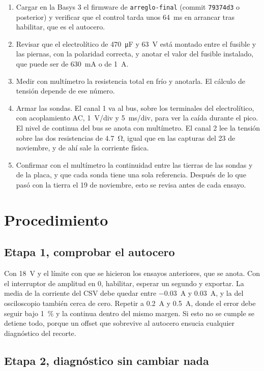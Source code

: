 \documentclass[11pt,a4paper]{article}
\begin{document}
\begin{enumerate}
\item Cargar en la Basys 3 el firmware de \texttt{arreglo-final} (commit \texttt{79374d3} o posterior) y verificar que el control tarda unos \SI{64}{ms} en arrancar tras habilitar, que es el autocero.
\item Revisar que el electrolítico de \SI{470}{\micro F} y \SI{63}{V} está montado entre el fusible y las piernas, con la polaridad correcta, y anotar el valor del fusible instalado, que puede ser de \SI{630}{mA} o de \SI{1}{A}.
\item Medir con multímetro la resistencia total en frío y anotarla. El cálculo de tensión depende de ese número.
\item Armar las sondas. El canal 1 va al bus, sobre los terminales del electrolítico, con acoplamiento AC, \SI{1}{V/div} y \SI{5}{ms/div}, para ver la caída durante el pico. El nivel de continua del bus se anota con multímetro. El canal 2 lee la tensión sobre las dos resistencias de \SI{4.7}{\ohm}, igual que en las capturas del 23 de noviembre, y de ahí sale la corriente física.
\item Confirmar con el multímetro la continuidad entre las tierras de las sondas y de la placa, y que cada sonda tiene una sola referencia. Después de lo que pasó con la tierra el 19 de noviembre, esto se revisa antes de cada ensayo.
\end{enumerate}

\section{Procedimiento}

\subsection*{Etapa 1, comprobar el autocero}

Con \SI{18}{V} y el límite con que se hicieron los ensayos anteriores, que se anota. Con el interruptor de amplitud en 0, habilitar, esperar un segundo y exportar. La media de la corriente del CSV debe quedar entre \SI{-0.03}{A} y \SI{+0.03}{A}, y la del osciloscopio también cerca de cero. Repetir a \SI{0.2}{A} y \SI{0.5}{A}, donde el error debe seguir bajo \SI{1}{\percent} y la continua dentro del mismo margen. Si esto no se cumple se detiene todo, porque un offset que sobrevive al autocero ensucia cualquier diagnóstico del recorte.

\subsection*{Etapa 2, diagnóstico sin cambiar nada}
\end{document}
